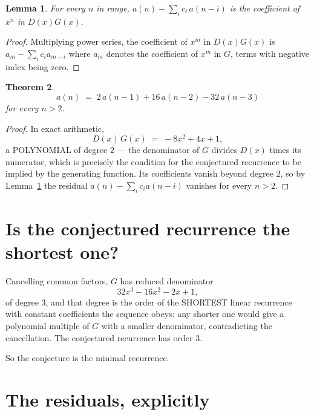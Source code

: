 \documentclass[11pt,a4paper]{article}
\theoremstyle{plain}
\newtheorem{theorem}{Theorem}
\newtheorem{lemma}[theorem]{Lemma}
\theoremstyle{definition}
\begin{document}
\begin{lemma}\label{lem:key}
For every $n$ in range, $a(n)-\sum_i c_i\,a(n-i)$ is the coefficient of $x^{n}$ in
$D(x)G(x)$.
\end{lemma}

\begin{proof}
Multiplying power series, the coefficient of $x^{m}$ in $D(x)G(x)$ is
$a_m-\sum_i c_i a_{m-i}$ where $a_m$ denotes the coefficient of $x^{m}$ in $G$, terms with
negative index being zero.
\end{proof}

\begin{theorem}
\[
a(n)\;=\;2\,a(n-1) + 16\,a(n-2) - 32\,a(n-3)
\]
for every $n>2$.
\end{theorem}

\begin{proof}
In exact arithmetic,
\[
D(x)\,G(x)\;=\;- 8 x^{2} + 4 x + 1,
\]
a POLYNOMIAL of degree $2$ --- the denominator of $G$ divides $D(x)$ times its numerator,
which is precisely the condition for the conjectured recurrence to be implied by the
generating function. Its coefficients vanish beyond degree $2$, so by
Lemma~\ref{lem:key} the residual $a(n)-\sum_ic_ia(n-i)$ vanishes for every
$n>2$.
\end{proof}

\section{Is the conjectured recurrence the shortest one?}

Cancelling common factors, $G$ has reduced denominator
\[
32 x^{3} - 16 x^{2} - 2 x + 1,
\]
of degree $3$, and that degree is the order of the SHORTEST linear recurrence with
constant coefficients the sequence obeys: any shorter one would give a polynomial multiple of
$G$ with a smaller denominator, contradicting the cancellation. The conjectured recurrence has
order $3$.

So the conjecture is the minimal recurrence.

\section{The residuals, explicitly}
\end{document}
